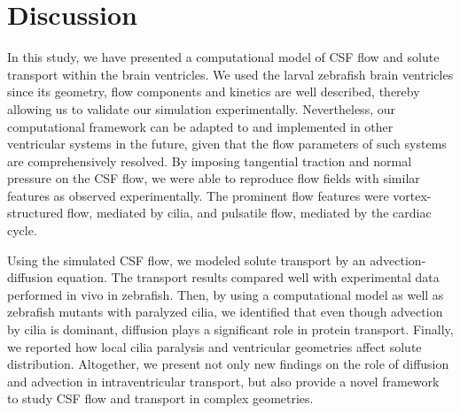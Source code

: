 \documentclass{WileyMSP-template}
\begin{document}
\section{Discussion}
In this study, we have presented a computational model of CSF flow and solute transport within the brain ventricles.
We used the larval zebrafish brain ventricles since its geometry,
flow components and kinetics are well described, thereby allowing us to validate
our simulation experimentally. Nevertheless, our computational framework can be adapted to and implemented in
other ventricular systems in the future, given that the flow parameters of such systems
are comprehensively resolved. By imposing tangential traction and normal pressure
on the CSF flow, we were able to reproduce flow fields with similar features
as observed experimentally. The prominent flow features were vortex-structured flow,
mediated by cilia, and pulsatile flow, mediated by the cardiac cycle.

Using the simulated CSF flow, we modeled solute transport by an advection-diffusion equation.
The transport results compared well with experimental data performed in vivo in zebrafish.
Then, by using a computational model as well as zebrafish mutants with paralyzed cilia,
we identified that even though advection by cilia is dominant,
diffusion plays a significant role in protein transport.
Finally, we reported how local cilia paralysis and ventricular geometries
affect solute distribution. Altogether, we present not only new findings on the role of
diffusion and advection in intraventricular transport, but also provide a novel framework to
study CSF flow and transport in complex geometries.
\end{document}
